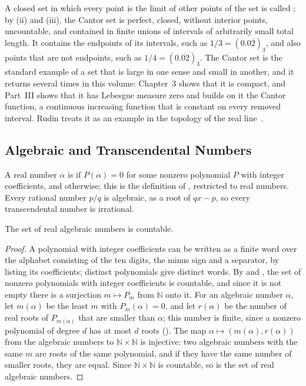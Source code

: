 A closed set in which every point is the limit of other points of the set is called ; by (ii) and (iii), the Cantor set is perfect, closed, without interior points, uncountable, and contained in finite unions of intervals of arbitrarily small total length. It contains the endpoints of its intervals, such as $1/3=(0.0\overline2)_3$, and also points that are not endpoints, such as $1/4=(0.\overline{02})_3$. The Cantor set is the standard example of a set that is large in one sense and small in another, and it returns several times in this volume: Chapter~3 shows that it is compact, and Part~III shows that it has Lebesgue measure zero and builds on it the Cantor function, a continuous increasing function that is constant on every removed interval. Rudin treats it as an example in the topology of the real line~\cite{rudin1976}.

\subsection{Algebraic and Transcendental Numbers}

A real number $\alpha$ is  if $P(\alpha)=0$ for some nonzero polynomial $P$ with integer coefficients, and  otherwise; this is the definition of , restricted to real numbers. Every rational number $p/q$ is algebraic, as a root of $qx-p$, so every transcendental number is irrational.

\begin{proposition}[Cantor]
\label{prop:algebraic-countable}
The set of real algebraic numbers is countable.
\end{proposition}

\begin{proof}
A polynomial with integer coefficients can be written as a finite word over the alphabet consisting of the ten digits, the minus sign and a separator, by listing its coefficients; distinct polynomials give distinct words. By  and , the set of nonzero polynomials with integer coefficients is countable, and since it is not empty there is a surjection $m\mapsto P_m$ from $\mathbb N$ onto it. For an algebraic number $\alpha$, let $m(\alpha)$ be the least $m$ with $P_m(\alpha)=0$, and let $r(\alpha)$ be the number of real roots of $P_{m(\alpha)}$ that are smaller than $\alpha$; this number is finite, since a nonzero polynomial of degree $d$ has at most $d$ roots (). The map $\alpha\mapsto(m(\alpha),r(\alpha))$ from the algebraic numbers to $\mathbb N\times\mathbb N$ is injective: two algebraic numbers with the same $m$ are roots of the same polynomial, and if they have the same number of smaller roots, they are equal. Since $\mathbb N\times\mathbb N$ is countable, so is the set of real algebraic numbers.
\end{proof}

